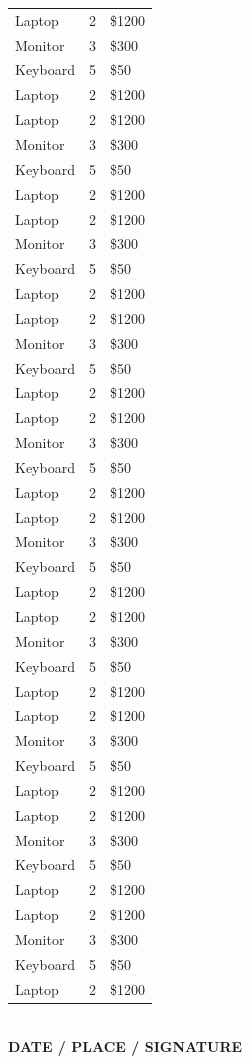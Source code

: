 \documentclass[10pt]{article}
\begin{document}
\begin{tabularx}{\textwidth}{p{11cm}|c|X}
  Laptop & 2 & \$1200 \\
Monitor & 3 & \$300 \\
Keyboard & 5 & \$50 \\
Laptop & 2 & \$1200 \\
Laptop & 2 & \$1200 \\
Monitor & 3 & \$300 \\
Keyboard & 5 & \$50 \\
Laptop & 2 & \$1200 \\
Laptop & 2 & \$1200 \\
Monitor & 3 & \$300 \\
Keyboard & 5 & \$50 \\
Laptop & 2 & \$1200 \\
Laptop & 2 & \$1200 \\
Monitor & 3 & \$300 \\
Keyboard & 5 & \$50 \\
Laptop & 2 & \$1200 \\
Laptop & 2 & \$1200 \\
Monitor & 3 & \$300 \\
Keyboard & 5 & \$50 \\
Laptop & 2 & \$1200 \\
Laptop & 2 & \$1200 \\
Monitor & 3 & \$300 \\
Keyboard & 5 & \$50 \\
Laptop & 2 & \$1200 \\
Laptop & 2 & \$1200 \\
Monitor & 3 & \$300 \\
Keyboard & 5 & \$50 \\
Laptop & 2 & \$1200 \\
Laptop & 2 & \$1200 \\
Monitor & 3 & \$300 \\
Keyboard & 5 & \$50 \\
Laptop & 2 & \$1200 \\
Laptop & 2 & \$1200 \\
Monitor & 3 & \$300 \\
Keyboard & 5 & \$50 \\
Laptop & 2 & \$1200 \\
Laptop & 2 & \$1200 \\
Monitor & 3 & \$300 \\
Keyboard & 5 & \$50 \\
Laptop & 2 & \$1200 \\
\end{tabularx}


\vspace{2cm}  

\noindent
\begin{minipage}[t]{0.35\textwidth}
  \hrulefill  
\end{minipage}
\\
\vspace{1cm}
\small{\textbf{DATE / PLACE / SIGNATURE}}
\end{document}
